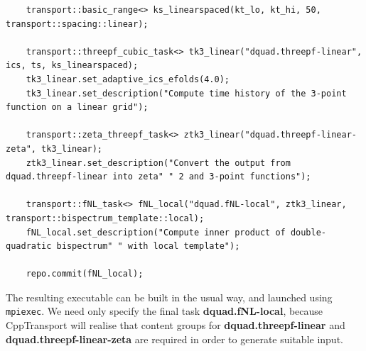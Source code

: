 \documentclass[11pt,a4paper]{article}
\newcommand{\repoobject}[1]{{\ttfamily\bfseries\small #1}}
\newcommand{\packagefont}{\sffamily}
\newcommand{\CppTransport}{{\packagefont CppTransport}}
\begin{document}
\begin{verbatim}
    transport::basic_range<> ks_linearspaced(kt_lo, kt_hi, 50, transport::spacing::linear);

    transport::threepf_cubic_task<> tk3_linear("dquad.threepf-linear", ics, ts, ks_linearspaced);
    tk3_linear.set_adaptive_ics_efolds(4.0);
    tk3_linear.set_description("Compute time history of the 3-point function on a linear grid");

    transport::zeta_threepf_task<> ztk3_linear("dquad.threepf-linear-zeta", tk3_linear);
    ztk3_linear.set_description("Convert the output from dquad.threepf-linear into zeta" " 2 and 3-point functions");

    transport::fNL_task<> fNL_local("dquad.fNL-local", ztk3_linear, transport::bispectrum_template::local);
    fNL_local.set_description("Compute inner product of double-quadratic bispectrum" " with local template");

    repo.commit(fNL_local);    
\end{verbatim}
The resulting executable can be built in the usual way,
and launched using \texttt{mpiexec}.
We need only specify the final
task \repoobject{dquad.fNL-local},
because {\CppTransport} will realise that content groups
for \repoobject{dquad.threepf-linear}
and \repoobject{dquad.threepf-linear-zeta}
are required in order to generate suitable input.
\end{document}
